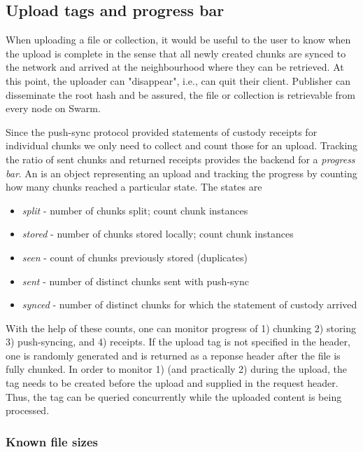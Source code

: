 \subsection{Upload tags and progress bar}\label{sec:tags}                                                                                        
When uploading a file or collection, it would be useful to the user to know when the upload is complete in the sense that all newly created chunks are synced to the network and arrived at the neighbourhood where they can be retrieved. At this point, the  uploader can "disappear",  i.e., can quit their client. Publisher can disseminate the root hash and be assured, the file or collection is retrievable from every node on Swarm. 

Since the push-sync protocol provided statements of custody receipts for individual chunks we only need to collect and count those for an upload. Tracking the ratio of sent chunks and returned receipts provides the backend for a \emph{progress bar}. An  is an object representing an upload and tracking the progress by counting how many chunks reached a particular state. The states are 

\begin{itemize}
\item \emph{split} - number of chunks split; count chunk instances
\item \emph{stored} - number of chunks stored locally; count chunk instances
\item \emph{seen} - count of chunks previously stored (duplicates)
\item \emph{sent} - number of distinct chunks sent with push-sync
\item \emph{synced} - number of distinct chunks for which the statement of custody arrived
\end{itemize}

With the help of these counts, one can monitor progress of 1) chunking 2) storing 3) push-syncing, and 4) receipts.
If the upload tag is not specified  in the header, one is randomly generated and is returned as a reponse header after the file is fully chunked. In order to monitor 1) (and practically 2) during the upload, the tag needs to be created before the upload and supplied in the request header. Thus, the tag can be queried concurrently while the uploaded content is being processed. 

\subsubsection{Known file sizes}


